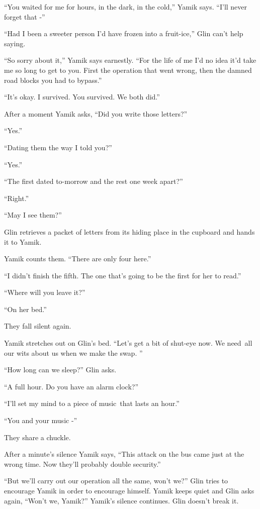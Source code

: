 \documentclass[twoside,11pt]{book}
\begin{document}
``You waited for me for hours, in the dark, in the cold,'' Yamik says. ``I'll
never forget that -'' 

``Had I been a sweeter person I'd have frozen into a fruit-ice,'' Glin can't help saying.

``So sorry about it,'' Yamik says earnestly. ``For the life of me I'd no idea
it'd take me so long to get to you. First the operation that went wrong, then the damned road blocks you had to
bypass.''

``It's okay. I survived. You survived. We both did.''

After a moment Yamik asks, ``Did you write those letters?'' 

``Yes.'' 

``Dating them the way I told you?'' 

``Yes.'' 

``The first dated to-morrow and the rest one week apart?'' 

``Right.'' 

``May I see them?'' 

Glin retrieves a packet of letters from its hiding place in the cupboard and hands it to Yamik. 

Yamik counts them. ``There are only four here.'' 

``I didn't finish the fifth. The one that's going to be the first for her to read.'' 

``Where will you leave it?'' 

``On her bed.''

They fall silent again.

Yamik stretches out on Glin's bed. ``Let's get a bit of shut-eye now. We need~all our wits about us when we
make the swap. '' 

``How long can we sleep?'' Glin asks. 

``A full hour. Do you have an alarm clock?'' 

``I'll set my mind to a piece of music~that lasts an hour.'' 

``You and your music -''

They share a chuckle.\ 

After a minute's silence Yamik says, ``This attack on the bus came just at the wrong time. Now they'll
probably double security.'' 

``But we'll carry out our operation all the same, won't we?'' Glin tries to encourage Yamik in
order to encourage himself. Yamik keeps quiet and Glin asks again, ``Won't we, Yamik?''
Yamik's silence continues. Glin doesn't break it.
\end{document}

